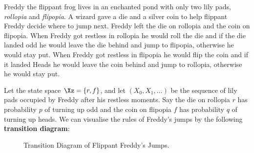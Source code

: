 \begin{example}\label{EX:FlippantFreddy}
Freddy the flippant frog lives in an enchanted pond with only two lily pads, {\em rollopia} and {\em flipopia}.  A wizard gave a  die and a silver coin to help flippant Freddy decide where to jump next.  Freddy left the die on rollopia and the coin on flipopia.  When Freddy got restless in rollopia he would roll the die and if the die landed odd he would leave the die behind and jump to flipopia, otherwise he would stay put.  When Freddy got restless in flipopia he would flip the coin and if it landed Heads he would leave the coin behind and jump to rollopia, otherwise he would stay put.

Let the state space $\Xz=\{r,f\}$, and let $(X_0, X_1,\ldots)$ be the sequence of lily pads occupied by Freddy after his restless moments.  Say the die on rollopia $r$ has probability $p$ of turning up odd and the coin on flipopia $f$ has probability $q$ of turning up heads.  We can visualise the rules of Freddy's jumps by the following {\bf transition diagram}:
\begin{figure}[htpb]
\caption{Transition Diagram of Flippant Freddy's Jumps.\label{F:FlippantFreddyTransDiag}}
\centering   {}
\end{figure}


\end{example}
